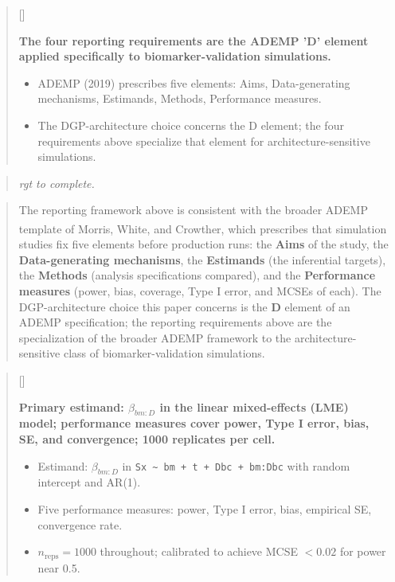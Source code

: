 \documentclass[
  11pt,
]{article}
\newcounter{pgraph}
\newenvironment{bullets}{%
  \stepcounter{pgraph}%
  \begin{quote}\small\sffamily\color[gray]{0.30}%
  {\normalfont\scriptsize\color[gray]{0.58}[\thepgraph]\enspace}}{%
  \end{quote}}
\newenvironment{rgt}{%
  \begin{quote}\small\itshape\color[RGB]{20,60,160}}{%
  \end{quote}}
\newenvironment{orig}{%
  \begin{quote}\normalsize\color[gray]{0.55}}{%
  \end{quote}}
\begin{document}
\begin{bullets}

\textbf{The four reporting requirements are the ADEMP 'D'
element applied specifically to biomarker-validation
simulations.}

\begin{itemize}\setlength{\itemsep}{2pt}\setlength{\parskip}{0pt}
\item ADEMP (2019) prescribes five elements:
  Aims, Data-generating mechanisms, Estimands, Methods,
  Performance measures.
\item The DGP-architecture choice concerns the D element;
  the four requirements above specialize that element for
  architecture-sensitive simulations.
\end{itemize}

\end{bullets}

\begin{rgt}
rgt to complete.

\end{rgt}

\begin{orig}
The reporting framework above is consistent with the broader ADEMP
template of Morris, White, and
Crowther\textsuperscript{}, which
prescribes that simulation studies fix five elements before production
runs: the \textbf{Aims} of the study, the
\textbf{Data-generating mechanisms}, the \textbf{Estimands} (the
inferential targets), the \textbf{Methods} (analysis specifications
compared), and the \textbf{Performance measures} (power, bias, coverage,
Type I error, and MCSEs of each). The DGP-architecture choice this paper
concerns is the \textbf{D} element of an ADEMP specification; the
reporting requirements above are the specialization of the broader ADEMP
framework to the architecture-sensitive class of biomarker-validation
simulations.

\end{orig}

\begin{bullets}

\textbf{Primary estimand: $\beta_{bm:D}$ in the linear
mixed-effects (LME) model;
performance measures cover power, Type I error, bias, SE, and
convergence; 1000 replicates per cell.}

\begin{itemize}\setlength{\itemsep}{2pt}\setlength{\parskip}{0pt}
\item Estimand: $\beta_{bm:D}$ in
  \texttt{Sx \textasciitilde{} bm + t + Dbc + bm:Dbc} with random
  intercept and AR(1).
\item Five performance measures: power, Type I error, bias,
  empirical SE, convergence rate.
\item $n_{\text{reps}} = 1000$ throughout; calibrated to
  achieve MCSE $< 0.02$ for power near 0.5.
\end{itemize}

\end{bullets}
\end{document}
